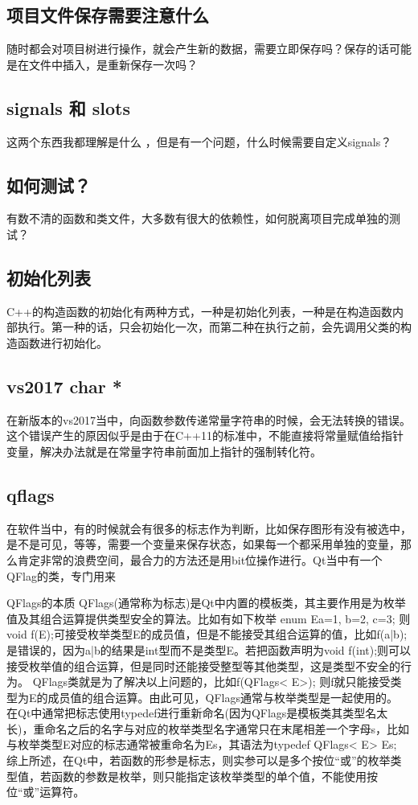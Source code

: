\subsection{项目文件保存需要注意什么}
随时都会对项目树进行操作，就会产生新的数据，需要立即保存吗？保存的话可能是在文件中插入，是重新保存一次吗？
\subsection{signals 和 slots}
这两个东西我都理解是什么 ，但是有一个问题，什么时候需要自定义signals？
\subsection{如何测试？}
有数不清的函数和类文件，大多数有很大的依赖性，如何脱离项目完成单独的测试？
\subsection{初始化列表}
C++的构造函数的初始化有两种方式，一种是初始化列表，一种是在构造函数内部执行。第一种的话，只会初始化一次，而第二种在执行之前，会先调用父类的构造函数进行初始化。
\subsection{vs2017 char *}
在新版本的vs2017当中，向函数参数传递常量字符串的时候，会无法转换的错误。这个错误产生的原因似乎是由于在C++11的标准中，不能直接将常量赋值给指针变量，解决办法就是在常量字符串前面加上指针的强制转化符。
\subsection{qflags}
在软件当中，有的时候就会有很多的标志作为判断，比如保存图形有没有被选中，是不是可见，等等，需要一个变量来保存状态，如果每一个都采用单独的变量，那么肯定非常的浪费空间，最合力的方法还是用bit位操作进行。Qt当中有一个QFlag的类，专门用来

QFlags的本质
QFlags(通常称为标志)是Qt中内置的模板类，其主要作用是为枚举值及其组合运算提供类型安全的算法。比如有如下枚举
enum E{a=1, b=2, c=3};
则void f(E);可接受枚举类型E的成员值，但是不能接受其组合运算的值，比如f(a|b);是错误的，因为a|b的结果是int型而不是类型E。若把函数声明为void f(int);则可以接受枚举值的组合运算，但是同时还能接受整型等其他类型，这是类型不安全的行为。
QFlags类就是为了解决以上问题的，比如f(QFlags< E>); 则f就只能接受类型为E的成员值的组合运算。由此可见，QFlags通常与枚举类型是一起使用的。
在Qt中通常把标志使用typedef进行重新命名(因为QFlags是模板类其类型名太长)，重命名之后的名字与对应的枚举类型名字通常只在末尾相差一个字母s，比如与枚举类型E对应的标志通常被重命名为Es，其语法为typedef QFlags< E> Es;
综上所述，在Qt中，若函数的形参是标志，则实参可以是多个按位“或”的枚举类型值，若函数的参数是枚举，则只能指定该枚举类型的单个值，不能使用按位“或”运算符。

